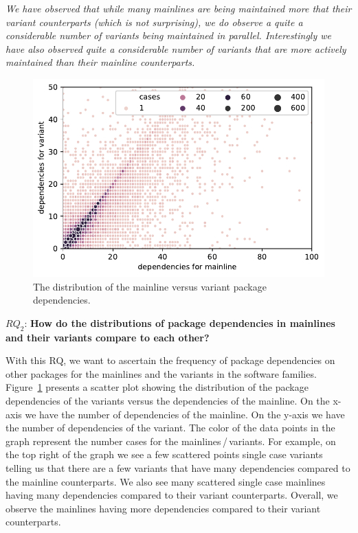 \begin{framed}
\noindent
\emph{We have observed that while many mainlines are being maintained more that their variant counterparts (which is not surprising), we do observe a quite a considerable number of variants being maintained in parallel. Interestingly we have also observed quite a considerable number of variants that are more actively maintained than their mainline counterparts.}
\end{framed}

\begin{figure}[htbp]
\vspace{-.3cm}
   \centering
    \includegraphics[scale=0.6]{figures/benevolj_dependencies.pdf}
    \caption{The distribution of the mainline versus variant package dependencies.}
    \label{fig:dependencies}
\end{figure}


$RQ_2$: \textbf{How do the distributions of package dependencies in mainlines and their variants compare to each other?}

With this RQ, we want to ascertain the frequency of package dependencies on other packages for the mainlines and the variants in the software families. 
Figure~\ref{fig:dependencies} presents a scatter plot showing the distribution of the package dependencies of the variants versus the dependencies of the mainline.
On the x-axis we have the number of dependencies of the mainline. 
On the y-axis we have the number of dependencies of the variant.
The color of the data points in the graph represent the number cases for the mainlines\,/\,variants.
For example, on the top right of the graph we see a few scattered points single case variants telling us that there are a few variants that have many dependencies compared to the mainline counterparts.
We also see many scattered single case mainlines having many dependencies compared to their variant counterparts. 
Overall, we observe the mainlines having more dependencies compared to their variant counterparts.

